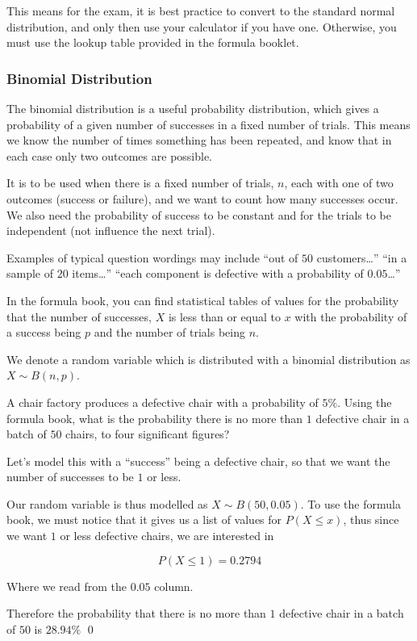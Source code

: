 This means for the exam, it is best practice to convert to the standard normal distribution, and only then use your calculator if you have one. Otherwise, you must use the lookup table provided in the formula booklet.

\subsubsection{Binomial Distribution} \label{sec:binomial-distribution}

The binomial distribution is a useful probability distribution, which gives a probability of a given number of successes in a fixed number of trials. This means we know the number of times something has been repeated, and know that in each case only two outcomes are possible.
    
It is to be used when there is a fixed number of trials, $n$, each with one of two outcomes (success or failure), and we want to count how many successes occur. We also need the probability of success to be constant and for the trials to be independent (not influence the next trial).

Examples of typical question wordings may include ``out of $50$ customers\ldots'' ``in a sample of $20$ items\ldots'' ``each component is defective with a probability of $0.05$\ldots''

In the formula book, you can find statistical tables of values for the probability that the number of successes, $X$ is less than or equal to $x$ with the probability of a success being $p$ and the number of trials being $n$.

We denote a random variable which is distributed with a binomial distribution as $X \sim B(n,p)$.

\begin{example}
    A chair factory produces a defective chair with a probability of $5\%$.
    Using the formula book, what is the probability there is no more than $1$ defective chair in a batch of $50$ chairs, to four significant figures?
\end{example}
\begin{solution}
    Let's model this with a ``success'' being a defective chair, so that we want the number of successes to be $1$ or less.

    Our random variable is thus modelled as $X \sim B(50, 0.05)$. To use the formula book, we must notice that it gives us a list of values for $P(X\leq x)$, thus since we want $1$ or less defective chairs, we are interested in 

    \[ P(X\leq 1) = 0.2794\]

    Where we read from the $0.05$ column.

    Therefore the probability that there is no more than $1$ defective chair in a batch of $50$ is $28.94\%$
    \qed
\end{solution}

